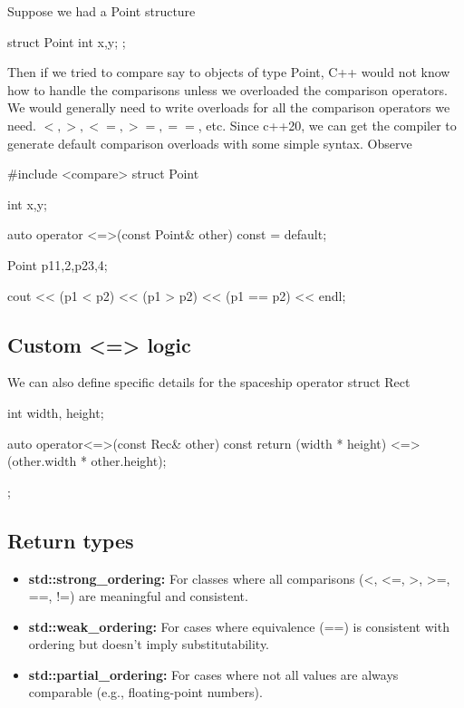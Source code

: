 \documentclass{report}
\begin{document}
\pagebreak 
{}
\bigbreak \noindent 
Suppose we had a Point structure
\bigbreak \noindent 
\begin{cppcode}
    struct Point {
        int x,y;
    };
\end{cppcode}
\bigbreak \noindent 
Then if we tried to compare say to objects of type Point, C++ would not know how to handle the comparisons unless we overloaded the comparison operators. We would generally need to write overloads for all the comparison operators we need. $<, >, <=, >=, ==$, etc. 
\bigbreak \noindent 
Since c++20, we can get the compiler to generate default comparison overloads with some simple syntax. Observe
\bigbreak \noindent 
\begin{cppcode}
    #include <compare>
    struct Point {
        int x,y;

        auto operator <=>(const Point& other) const = default;
    }

    Point p1{1,2},p2{3,4};

    cout << (p1 < p2) << 
        (p1 > p2) << 
        (p1 == p2) << endl;
\end{cppcode}
\bigbreak \noindent 
\subsection{Custom <=> logic}
\bigbreak \noindent 
We can also define specific details for the spaceship operator
\bigbreak \noindent 
struct Rect {
    int width, height;

    auto operator<=>(const Rec& other) const {
        return (width * height) <=> (other.width * other.height);
    }
};

\bigbreak \noindent 
\subsection{Return types}
\bigbreak \noindent 
\begin{itemize}
    \item \textbf{std::strong\_ordering:} For classes where all comparisons (<, <=, >, >=, ==, !=) are meaningful and consistent.
    \item \textbf{std::weak\_ordering:} For cases where equivalence (==) is consistent with ordering but doesn't imply substitutability.
    \item \textbf{std::partial\_ordering:} For cases where not all values are always comparable (e.g., floating-point numbers).
\end{itemize}
\end{document}
